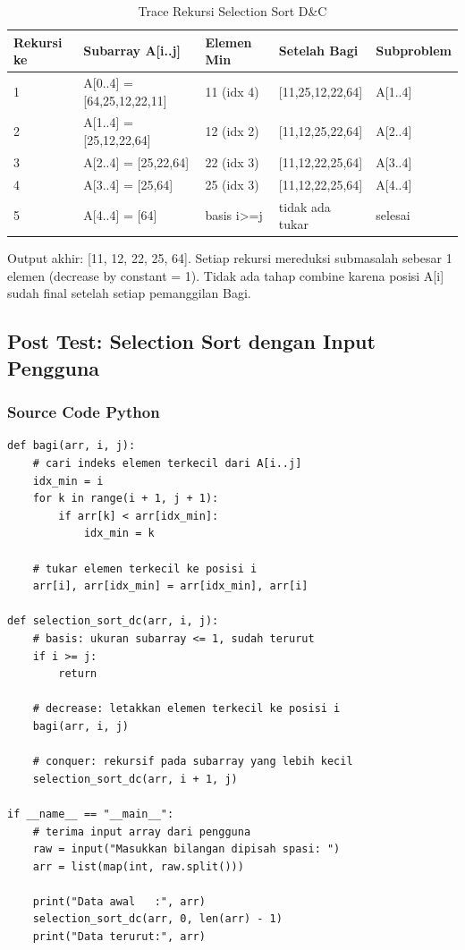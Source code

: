 \begin{table}[H]
    \centering
    \caption{Trace Rekursi Selection Sort D\&C}
    \begin{tabular}{lllll}
    \toprule
    \textbf{Rekursi ke} & \textbf{Subarray A[i..j]} & \textbf{Elemen Min} & \textbf{Setelah Bagi} & \textbf{Subproblem} \\ \midrule
    1 & A[0..4] = [64,25,12,22,11] & 11 (idx 4) & [11,25,12,22,64] & A[1..4] \\
    2 & A[1..4] = [25,12,22,64] & 12 (idx 2) & [11,12,25,22,64] & A[2..4] \\
    3 & A[2..4] = [25,22,64] & 22 (idx 3) & [11,12,22,25,64] & A[3..4] \\
    4 & A[3..4] = [25,64] & 25 (idx 3) & [11,12,22,25,64] & A[4..4] \\
    5 & A[4..4] = [64] & basis i>=j & tidak ada tukar & selesai \\ \bottomrule
    \end{tabular}
\end{table}

Output akhir: [11, 12, 22, 25, 64]. Setiap rekursi mereduksi submasalah sebesar 1 elemen (decrease by constant = 1). Tidak ada tahap combine karena posisi A[i] sudah final setelah setiap pemanggilan Bagi.

\subsection{Post Test: Selection Sort dengan Input Pengguna}

\subsubsection*{Source Code Python}
\begin{lstlisting}[basicstyle=\ttfamily\scriptsize, frame=single, backgroundcolor=\color{white}, numbers=none, keywordstyle=\color{black}, commentstyle=\color{black}, stringstyle=\color{black}, breaklines=true]
def bagi(arr, i, j):
    # cari indeks elemen terkecil dari A[i..j]
    idx_min = i
    for k in range(i + 1, j + 1):
        if arr[k] < arr[idx_min]:
            idx_min = k
            
    # tukar elemen terkecil ke posisi i
    arr[i], arr[idx_min] = arr[idx_min], arr[i]

def selection_sort_dc(arr, i, j):
    # basis: ukuran subarray <= 1, sudah terurut
    if i >= j:
        return
        
    # decrease: letakkan elemen terkecil ke posisi i
    bagi(arr, i, j)
    
    # conquer: rekursif pada subarray yang lebih kecil
    selection_sort_dc(arr, i + 1, j)

if __name__ == "__main__":
    # terima input array dari pengguna
    raw = input("Masukkan bilangan dipisah spasi: ")
    arr = list(map(int, raw.split()))
    
    print("Data awal   :", arr)
    selection_sort_dc(arr, 0, len(arr) - 1)
    print("Data terurut:", arr)
\end{lstlisting}


